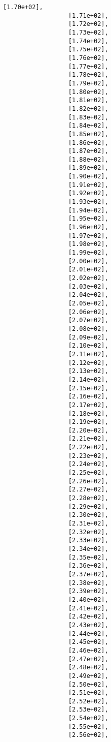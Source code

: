 \documentclass[11pt]{article}
\begin{document}
\begin{Verbatim}[commandchars=\\\{\}]
                  [1.70e+02],
                  [1.71e+02],
                  [1.72e+02],
                  [1.73e+02],
                  [1.74e+02],
                  [1.75e+02],
                  [1.76e+02],
                  [1.77e+02],
                  [1.78e+02],
                  [1.79e+02],
                  [1.80e+02],
                  [1.81e+02],
                  [1.82e+02],
                  [1.83e+02],
                  [1.84e+02],
                  [1.85e+02],
                  [1.86e+02],
                  [1.87e+02],
                  [1.88e+02],
                  [1.89e+02],
                  [1.90e+02],
                  [1.91e+02],
                  [1.92e+02],
                  [1.93e+02],
                  [1.94e+02],
                  [1.95e+02],
                  [1.96e+02],
                  [1.97e+02],
                  [1.98e+02],
                  [1.99e+02],
                  [2.00e+02],
                  [2.01e+02],
                  [2.02e+02],
                  [2.03e+02],
                  [2.04e+02],
                  [2.05e+02],
                  [2.06e+02],
                  [2.07e+02],
                  [2.08e+02],
                  [2.09e+02],
                  [2.10e+02],
                  [2.11e+02],
                  [2.12e+02],
                  [2.13e+02],
                  [2.14e+02],
                  [2.15e+02],
                  [2.16e+02],
                  [2.17e+02],
                  [2.18e+02],
                  [2.19e+02],
                  [2.20e+02],
                  [2.21e+02],
                  [2.22e+02],
                  [2.23e+02],
                  [2.24e+02],
                  [2.25e+02],
                  [2.26e+02],
                  [2.27e+02],
                  [2.28e+02],
                  [2.29e+02],
                  [2.30e+02],
                  [2.31e+02],
                  [2.32e+02],
                  [2.33e+02],
                  [2.34e+02],
                  [2.35e+02],
                  [2.36e+02],
                  [2.37e+02],
                  [2.38e+02],
                  [2.39e+02],
                  [2.40e+02],
                  [2.41e+02],
                  [2.42e+02],
                  [2.43e+02],
                  [2.44e+02],
                  [2.45e+02],
                  [2.46e+02],
                  [2.47e+02],
                  [2.48e+02],
                  [2.49e+02],
                  [2.50e+02],
                  [2.51e+02],
                  [2.52e+02],
                  [2.53e+02],
                  [2.54e+02],
                  [2.55e+02],
                  [2.56e+02],

\end{Verbatim}
\end{document}
